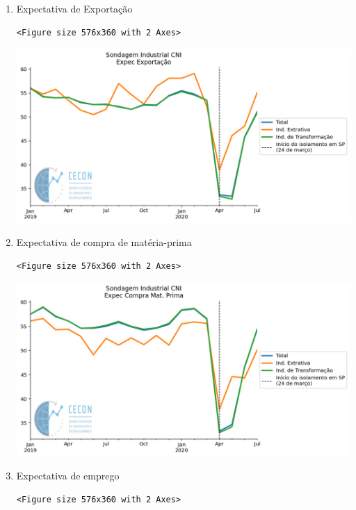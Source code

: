 \documentclass[11pt]{article}
\begin{document}
\begin{enumerate}
\item Expectativa de Exportação
\label{sec:org3dfb3b5}

\begin{verbatim}
<Figure size 576x360 with 2 Axes>
\end{verbatim}


\begin{center}
\includegraphics[width=.9\linewidth]{obipy-resources/62e383af79e91b63c7fc98dd7fb55b3c3ececcb9/9b4f75ae5dfbd3b780483f3ba4e18217227ba501.png}
\end{center}

\item Expectativa de compra de matéria-prima
\label{sec:orge0216de}


\begin{verbatim}
<Figure size 576x360 with 2 Axes>
\end{verbatim}


\begin{center}
\includegraphics[width=.9\linewidth]{obipy-resources/62e383af79e91b63c7fc98dd7fb55b3c3ececcb9/cc12013aec1a7595bfa8d41ae3d6896fb2a84060.png}
\end{center}

\item Expectativa de emprego
\label{sec:orgec14f96}

\begin{verbatim}
<Figure size 576x360 with 2 Axes>
\end{verbatim}



\end{enumerate}
\end{document}
